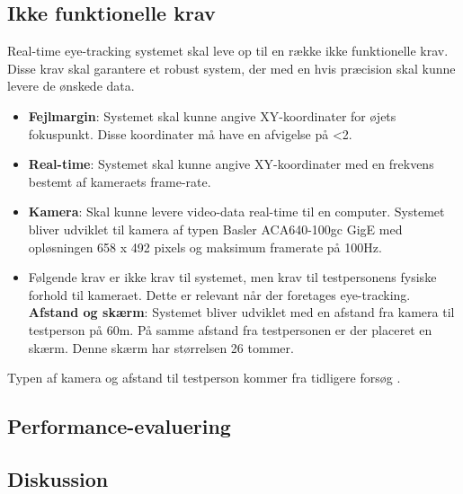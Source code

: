 \documentclass[rapport.tex]{subfiles}
\begin{document}
	\subsection{Ikke funktionelle krav}
	Real-time eye-tracking systemet skal leve op til en række ikke funktionelle krav. Disse krav skal garantere et robust system, der med en hvis præcision skal kunne levere de ønskede data.\\
	\begin{itemize}
		\item 
		\textbf{Fejlmargin}: Systemet skal kunne angive XY-koordinater for øjets fokuspunkt. Disse koordinater må have en afvigelse på <2\degree \cite{FairchildInSiboska}.
		\item 
		\textbf{Real-time}: Systemet skal kunne angive XY-koordinater med en frekvens bestemt af kameraets frame-rate. 
		\item
		\textbf{Kamera}: Skal kunne levere video-data real-time til en computer. Systemet bliver udviklet til kamera af typen Basler
		ACA640-100gc GigE med opløsningen 658 x 492 pixels og maksimum framerate på 100Hz.
		\item Følgende krav er ikke krav til systemet, men krav til testpersonens fysiske forhold til kameraet. Dette er relevant når der foretages eye-tracking. \\
		\textbf{Afstand og skærm}: Systemet bliver udviklet med en afstand fra kamera til testperson på 60m. 
		På samme afstand fra testpersonen er der placeret en skærm. Denne skærm har størrelsen 26 tommer.
	\end{itemize}
	
	Typen af kamera og afstand til testperson kommer fra tidligere forsøg \cite{Siboska}.
	\subsection{Performance-evaluering}
	\subsection{Diskussion}
	
		
\end{document}
